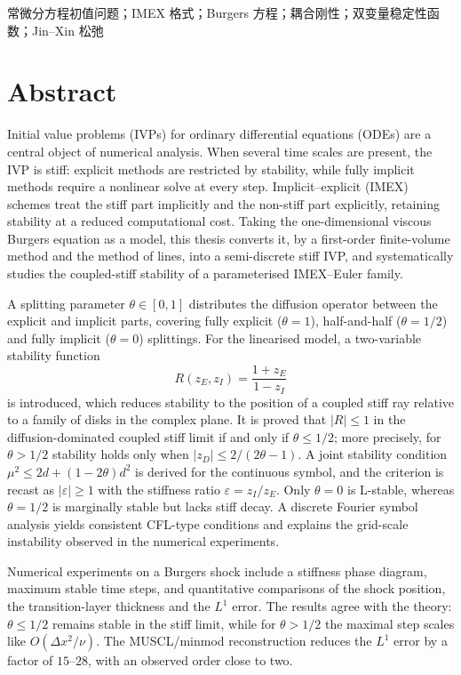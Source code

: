 \vspace{1.2em}
常微分方程初值问题；IMEX 格式；Burgers 方程；耦合刚性；双变量稳定性函数；Jin--Xin 松弛
\endgroup

\clearpage

\chapter*{\texorpdfstring{Abstract}{Abstract}}

\begingroup
\linespread{1.08}\selectfont

Initial value problems (IVPs) for ordinary differential equations (ODEs) are a central object of numerical analysis. When several time scales are present, the IVP is stiff: explicit methods are restricted by stability, while fully implicit methods require a nonlinear solve at every step. Implicit--explicit (IMEX) schemes treat the stiff part implicitly and the non-stiff part explicitly, retaining stability at a reduced computational cost. Taking the one-dimensional viscous Burgers equation as a model, this thesis converts it, by a first-order finite-volume method and the method of lines, into a semi-discrete stiff IVP, and systematically studies the coupled-stiff stability of a parameterised IMEX--Euler family.

A splitting parameter $\theta\in[0,1]$ distributes the diffusion operator between the explicit and implicit parts, covering fully explicit ($\theta=1$), half-and-half ($\theta=1/2$) and fully implicit ($\theta=0$) splittings. For the linearised model, a two-variable stability function
\[
  R(z_E,z_I)=\frac{1+z_E}{1-z_I}
\]
is introduced, which reduces stability to the position of a coupled stiff ray relative to a family of disks in the complex plane. It is proved that $|R|\le 1$ in the diffusion-dominated coupled stiff limit if and only if $\theta\le 1/2$; more precisely, for $\theta>1/2$ stability holds only when $|z_D|\le 2/(2\theta-1)$. A joint stability condition $\mu^2\le 2d+(1-2\theta)d^2$ is derived for the continuous symbol, and the criterion is recast as $|\varepsilon|\ge1$ with the stiffness ratio $\varepsilon=z_I/z_E$. Only $\theta=0$ is L-stable, whereas $\theta=1/2$ is marginally stable but lacks stiff decay. A discrete Fourier symbol analysis yields consistent CFL-type conditions and explains the grid-scale instability observed in the numerical experiments.

Numerical experiments on a Burgers shock include a stiffness phase diagram, maximum stable time steps, and quantitative comparisons of the shock position, the transition-layer thickness and the $L^1$ error. The results agree with the theory: $\theta\le 1/2$ remains stable in the stiff limit, while for $\theta>1/2$ the maximal step scales like $O(\Delta x^2/\nu)$. The MUSCL/minmod reconstruction reduces the $L^1$ error by a factor of $15$--$28$, with an observed order close to two.

